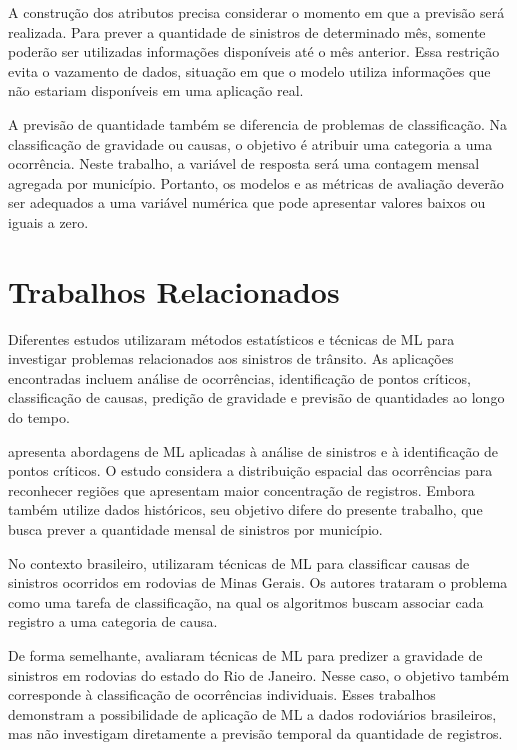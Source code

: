 \documentclass[12pt]{article}
\begin{document}
A construção dos atributos precisa considerar o momento em que a previsão será realizada. Para prever a quantidade de sinistros de determinado mês, somente poderão ser utilizadas informações disponíveis até o mês anterior. Essa restrição evita o vazamento de dados, situação em que o modelo utiliza informações que não estariam disponíveis em uma aplicação real.

A previsão de quantidade também se diferencia de problemas de classificação. Na classificação de gravidade ou causas, o objetivo é atribuir uma categoria a uma ocorrência. Neste trabalho, a variável de resposta será uma contagem mensal agregada por município. Portanto, os modelos e as métricas de avaliação deverão ser adequados a uma variável numérica que pode apresentar valores baixos ou iguais a zero.

\section{Trabalhos Relacionados}

Diferentes estudos utilizaram métodos estatísticos e técnicas de ML para investigar problemas relacionados aos sinistros de trânsito. As aplicações encontradas incluem análise de ocorrências, identificação de pontos críticos, classificação de causas, predição de gravidade e previsão de quantidades ao longo do tempo.

\cite{santos2021machine} apresenta abordagens de ML aplicadas à análise de sinistros e à identificação de pontos críticos. O estudo considera a distribuição espacial das ocorrências para reconhecer regiões que apresentam maior concentração de registros. Embora também utilize dados históricos, seu objetivo difere do presente trabalho, que busca prever a quantidade mensal de sinistros por município.

No contexto brasileiro, \cite{silva2024classificacao} utilizaram técnicas de ML para classificar causas de sinistros ocorridos em rodovias de Minas Gerais. Os autores trataram o problema como uma tarefa de classificação, na qual os algoritmos buscam associar cada registro a uma categoria de causa.

De forma semelhante, \cite{mafort2025tecnicas} avaliaram técnicas de ML para predizer a gravidade de sinistros em rodovias do estado do Rio de Janeiro. Nesse caso, o objetivo também corresponde à classificação de ocorrências individuais. Esses trabalhos demonstram a possibilidade de aplicação de ML a dados rodoviários brasileiros, mas não investigam diretamente a previsão temporal da quantidade de registros.
\end{document}
